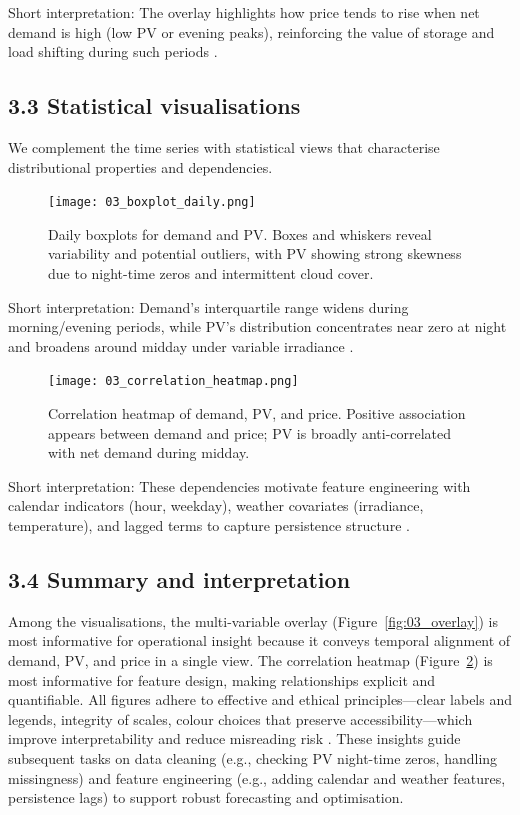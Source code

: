\documentclass[12pt,a4paper]{article}
\begin{document}
Short interpretation: The overlay highlights how price tends to rise when net demand is high (low PV or evening peaks), reinforcing the value of storage and load shifting during such periods \cite{Hyndman2021}.

\subsection*{3.3 Statistical visualisations}
We complement the time series with statistical views that characterise distributional properties and dependencies.

\begin{figure}[H]
  \centering
  \texttt{[image: 03\_boxplot\_daily.png]}
  \caption{Daily boxplots for demand and PV. Boxes and whiskers reveal variability and potential outliers, with PV showing strong skewness due to night-time zeros and intermittent cloud cover.}
  \label{fig:03_boxplot_daily}
\end{figure}

Short interpretation: Demand’s interquartile range widens during morning/evening periods, while PV’s distribution concentrates near zero at night and broadens around midday under variable irradiance \cite{Antonanzas2016}.

\begin{figure}[H]
  \centering
  \texttt{[image: 03\_correlation\_heatmap.png]}
  \caption{Correlation heatmap of demand, PV, and price. Positive association appears between demand and price; PV is broadly anti-correlated with net demand during midday.}
  \label{fig:03_corr}
\end{figure}

Short interpretation: These dependencies motivate feature engineering with calendar indicators (hour, weekday), weather covariates (irradiance, temperature), and lagged terms to capture persistence structure \cite{Hyndman2021}.

\subsection*{3.4 Summary and interpretation}
Among the visualisations, the multi-variable overlay (Figure~\ref{fig:03_overlay}) is most informative for operational insight because it conveys temporal alignment of demand, PV, and price in a single view. The correlation heatmap (Figure~\ref{fig:03_corr}) is most informative for feature design, making relationships explicit and quantifiable. All figures adhere to effective and ethical principles—clear labels and legends, integrity of scales, colour choices that preserve accessibility—which improve interpretability and reduce misreading risk \cite{Tufte1983}. These insights guide subsequent tasks on data cleaning (e.g., checking PV night-time zeros, handling missingness) and feature engineering (e.g., adding calendar and weather features, persistence lags) to support robust forecasting and optimisation.
\end{document}
